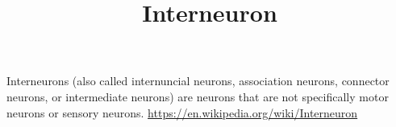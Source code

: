 \documentclass[a4paper]{article}
\title{Interneuron}
\date{}
\begin{document}
    \maketitle
    Interneurons (also called internuncial neurons, association neurons, connector neurons, or intermediate neurons) are neurons that are not specifically motor neurons or sensory neurons. \url{https://en.wikipedia.org/wiki/Interneuron}
\end{document}
